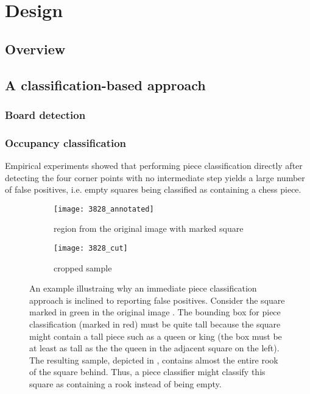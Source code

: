 \documentclass[../main.tex]{subfiles}
\begin{document}
\chapter{Design}
\section{Overview}


\section{A classification-based approach}
\subsection{Board detection}
\subsection{Occupancy classification}
Empirical experiments showed that performing piece classification directly after detecting the four corner points with no intermediate step yields a large number of false positives, i.e. empty squares being classified as containing a chess piece.
\begin{figure}
    \centering
    \begin{subfigure}[b]{0.65\textwidth}
        \centering
        \texttt{[image: 3828\_annotated]}
        \caption{region from the original image with marked square}
        \label{fig:occupancy_classification_fp_original}
    \end{subfigure}
    \hfill
    \begin{subfigure}[b]{0.3\textwidth}
        \centering
        \texttt{[image: 3828\_cut]}
        \caption{cropped sample}
        \label{fig:occupancy_classification_fp_cropped}
    \end{subfigure}
    \caption[An example illustraing why an immediate piece classification approach is inclined to reporting false positives.]{An example illustraing why an immediate piece classification approach is inclined to reporting false positives. Consider the square marked in green in the original image . The bounding box for piece classification (marked in red) must be quite tall because the square might contain a tall piece such as a queen or king (the box must be at least as tall as the the queen in the adjacent square on the left). The resulting sample, depicted in , contains almost the entire rook of the square behind. Thus, a piece classifier might classify this square as containing a rook instead of being empty.}
    \label{fig:occupancy_classification_fp}
\end{figure}
\end{document}
